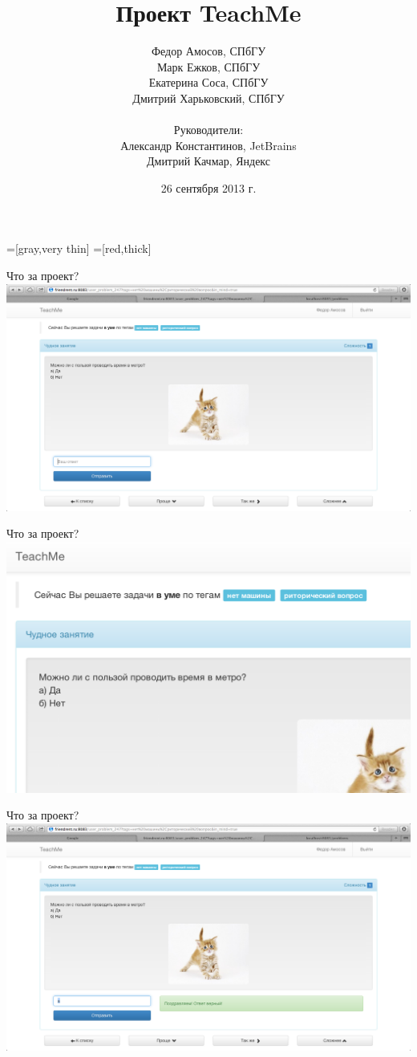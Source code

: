 \documentclass[fullscreen, unicode, bookmarks = false]{beamer}
\title{Проект TeachMe}
\author{
	Федор Амосов, СПбГУ \\
    Марк Ежков, СПбГУ	\\
    Екатерина Соса, СПбГУ	\\
    Дмитрий Харьковский, СПбГУ	\\~\\
    Руководители:	\\ 
    Александр Константинов, JetBrains \\
    Дмитрий Качмар, Яндекс	\\ 
}
\date{26 сентября 2013 г.}
\begin{document}
    =[gray,very thin]
    =[red,thick]

    \begin{frame}
        \titlepage
    \end{frame}

    \begin{frame}{Что за проект?}
        \includegraphics[scale=0.23]{metro1.png}
    \end{frame}
    \begin{frame}{Что за проект?}
        \includegraphics[scale=0.27]{metro2.png}
    \end{frame}
    \begin{frame}{Что за проект?}
        \includegraphics[scale=0.23]{metro3.png}
    \end{frame}
    
\end{document}
